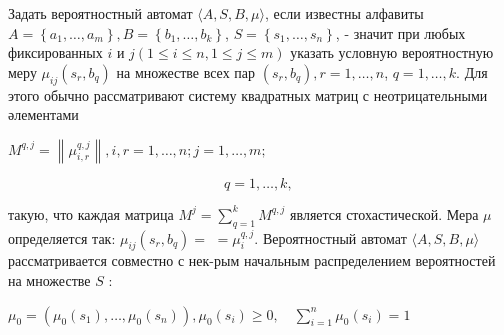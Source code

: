 \documentclass[10pt]{article}
\begin{document}
Задать вероятностный автомат $\langle A, S, B, \mu\rangle$, если известны алфавиты $A=\left\{a_{1}, \ldots, a_{m}\right\}, B=\left\{b_{1}, \ldots, b_{k}\right\}$, $S=\left\{s_{1}, \ldots, s_{n}\right\}$, - значит при любых фиксированных $i$ и $j(1 \leqslant i \leqslant n, 1 \leqslant j \leqslant m)$ указать условную вероятностную меру $\mu_{i j}\left(s_{r}, b_{q}\right)$ на множестве всех пар $\left(s_{r}, b_{q}\right), r=1, \ldots, n$, $q=1, \ldots, k$. Для этого обычно рассматривают систему квадратных матриц с неотрицательными әлементами



$M^{q, j}=\left\|\mu_{i, r}^{q, j}\right\|, i, r=1, \ldots, n ; j=1, \ldots, m ;$



\[

q=1, \ldots, k \text {, }

\]



такую, что каждая матрица $M^{j}=\sum_{q=1}^{k} M^{q, j}$ является стохастической. Мера $\mu$ определяется так: $\mu_{i j}\left(s_{r}, b_{q}\right)=$ $=\mu_{i}^{q, j}$. Вероятностный автомат $\langle A, S, B, \mu\rangle$ рассматривается совместно с нек-рым начальным распределением вероятностей на множестве $S$ :



$\mu_{0}=\left(\mu_{0}\left(s_{1}\right), \ldots, \mu_{0}\left(s_{n}\right)\right), \mu_{0}\left(s_{i}\right) \geqslant 0, \quad \sum_{i=1}^{n} \mu_{0}\left(s_{i}\right)=1$
\end{document}
